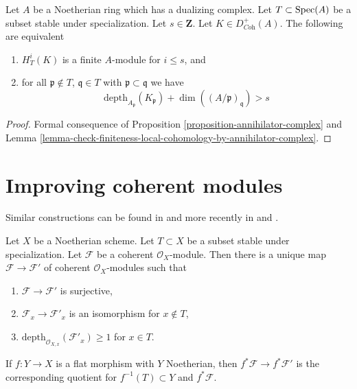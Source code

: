 \begin{proposition}
\label{proposition-finiteness-complex}
Let $A$ be a Noetherian ring which has a dualizing complex.
Let $T \subset \mathop{\mathrm{Spec}}(A)$ be a subset stable under specialization.
Let $s \in \mathbf{Z}$. Let $K \in D_{\textit{Coh}}^+(A)$.
The following are equivalent
\begin{enumerate}
\item $H^i_T(K)$ is a finite $A$-module for $i \leq s$, and
\item for all $\mathfrak p \not \in T$, $\mathfrak q \in T$ with
$\mathfrak p \subset \mathfrak q$ we have
$$
\text{depth}_{A_\mathfrak p}(K_\mathfrak p) +
\dim((A/\mathfrak p)_\mathfrak q) > s
$$
\end{enumerate}
\end{proposition}

\begin{proof}
Formal consequence of
Proposition \ref{proposition-annihilator-complex} and
Lemma \ref{lemma-check-finiteness-local-cohomology-by-annihilator-complex}.
\end{proof}






\section{Improving coherent modules}
\label{section-improve}

\noindent
Similar constructions can be found in \cite{EGA} and more recently in
\cite{Kollar-local-global-hulls} and \cite{Kollar-variants}.

\begin{lemma}
\label{lemma-get-depth-1-along-Z}
Let $X$ be a Noetherian scheme. Let $T \subset X$ be a subset
stable under specialization. Let $\mathcal{F}$ be a coherent
$\mathcal{O}_X$-module. Then there is a unique map
$\mathcal{F} \to \mathcal{F}'$ of coherent $\mathcal{O}_X$-modules
such that
\begin{enumerate}
\item $\mathcal{F} \to \mathcal{F}'$ is surjective,
\item $\mathcal{F}_x \to \mathcal{F}'_x$ is an isomorphism for $x \not \in T$,
\item $\text{depth}_{\mathcal{O}_{X, x}}(\mathcal{F}'_x) \geq 1$ for $x \in T$.
\end{enumerate}
If $f : Y \to X$ is a flat morphism with $Y$ Noetherian, then
$f^*\mathcal{F} \to f^*\mathcal{F}'$ is the corresponding
quotient for $f^{-1}(T) \subset Y$ and $f^*\mathcal{F}$.
\end{lemma}

